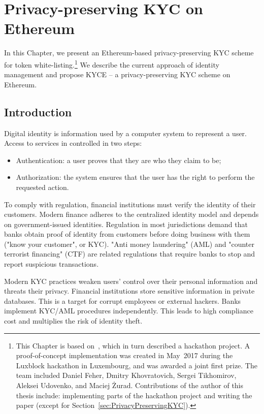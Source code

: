 \chapter{Privacy-preserving KYC on Ethereum}

\label{Chapter12KYC}

In this Chapter, we present an Ethereum-based privacy-preserving KYC scheme for token white-listing.\footnote{This Chapter is based on~\cite{Biryukov2018}, which in turn described a hackathon project. A proof-of-concept implementation was created in May~2017 during the Luxblock hackathon in Luxembourg, and was awarded a joint first prize. The team included Daniel Feher, Dmitry Khovratovich, Sergei Tikhomirov, Aleksei Udovenko, and Maciej \.{Z}urad. Contributions of the author of this thesis include: implementing parts of the hackathon project and writing the paper (except for Section~\ref{sec:PrivacyPreservingKYC}).}
We describe the current approach of identity management and propose KYCE -- a privacy-preserving KYC scheme on Ethereum.



\section{Introduction}

Digital identity is information used by a computer system to represent a user.
Access to services in controlled in two steps:

\begin{itemize}
	\item Authentication: a user proves that they are who they claim to be;
	\item Authorization: the system ensures that the user has the right to perform the requested action.
\end{itemize}

To comply with regulation, financial institutions must verify the identity of their customers.
Modern finance adheres to the centralized identity model and depends on government-issued identities.
Regulation in most jurisdictions demand that banks obtain proof of identity from customers before doing business with them ("know your customer", or KYC).
"Anti money laundering" (AML) and "counter terrorist financing" (CTF) are related regulations that require banks to stop and report suspicious transactions.

Modern KYC practices weaken users' control over their personal information and threats their privacy.
Financial institutions store sensitive information in private databases.
This is a target for corrupt employees or external hackers.
Banks implement KYC/AML procedures independently.
This leads to high compliance cost and multiplies the risk of identity theft.

